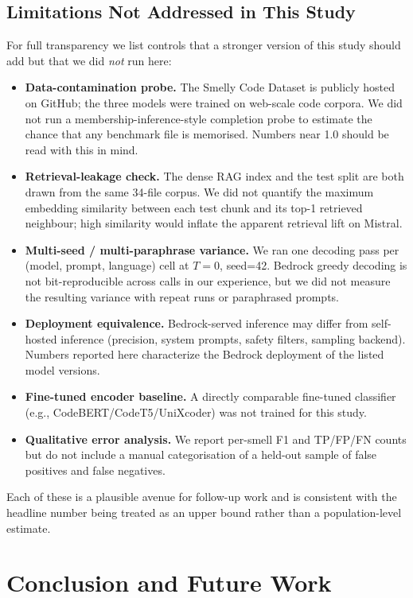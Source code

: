 \documentclass[conference]{IEEEtran}
\begin{document}
\subsection{Limitations Not Addressed in This Study}
For full transparency we list controls that a stronger version of this
study should add but that we did \emph{not} run here:
\begin{itemize}
 \item \textbf{Data-contamination probe.} The Smelly Code Dataset is
 publicly hosted on GitHub; the three models were trained on
 web-scale code corpora. We did not run a membership-inference-style
 completion probe to estimate the chance that any benchmark file is
 memorised. Numbers near 1.0 should be read with this in mind.
 \item \textbf{Retrieval-leakage check.} The dense RAG index and the
 test split are both drawn from the same 34-file corpus. We did not
 quantify the maximum embedding similarity between each test chunk
 and its top-1 retrieved neighbour; high similarity would inflate
 the apparent retrieval lift on Mistral.
 \item \textbf{Multi-seed / multi-paraphrase variance.} We ran one
 decoding pass per (model, prompt, language) cell at $T{=}0$,
 seed=42. Bedrock greedy decoding is not bit-reproducible across
 calls in our experience, but we did not measure the resulting
 variance with repeat runs or paraphrased prompts.
 \item \textbf{Deployment equivalence.} Bedrock-served inference may
 differ from self-hosted inference (precision, system prompts,
 safety filters, sampling backend). Numbers reported here
 characterize the Bedrock deployment of the listed model versions.
 \item \textbf{Fine-tuned encoder baseline.} A directly comparable
 fine-tuned classifier (e.g., CodeBERT/CodeT5/UniXcoder) was not
 trained for this study.
 \item \textbf{Qualitative error analysis.} We report per-smell F1
 and TP/FP/FN counts but do not include a manual categorisation of
 a held-out sample of false positives and false negatives.
\end{itemize}
Each of these is a plausible avenue for follow-up work and is
consistent with the headline number being treated as an upper bound
rather than a population-level estimate.

\section{Conclusion and Future Work}
\label{sec:conclusion}
\end{document}
